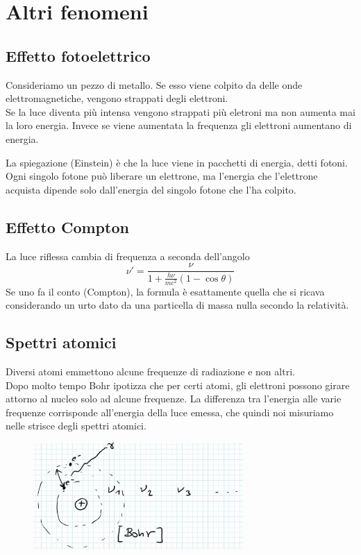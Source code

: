 \section{Altri fenomeni}
\subsection{Effetto fotoelettrico}
Consideriamo un pezzo di metallo. Se esso viene colpito da delle onde elettromagnetiche, vengono strappati degli elettroni.\\
Se la luce diventa pi\`u intensa vengono strappati pi\`u eletroni ma non aumenta mai la loro energia. Invece se viene aumentata la frequenza gli elettroni aumentano di energia.\bigskip

\noindent
La spiegazione (Einstein) \`e che la luce viene in pacchetti di energia, detti fotoni. Ogni singolo fotone pu\`o liberare un elettrone, ma l'energia che l'elettrone acquista dipende solo dall'energia del singolo fotone che l'ha colpito.

\subsection{Effetto Compton}
La luce riflessa cambia di frequenza a seconda dell'angolo
\[\nu'=\frac{\nu}{1+\frac{h\nu}{mc^2}(1-\cos\theta)}\]
Se uno fa il conto (Compton), la formula \`e esattamente quella che si ricava considerando un urto dato da una particella di massa nulla secondo la relativit\`a.

\subsection{Spettri atomici}
Diversi atomi emmettono alcune frequenze di radiazione e non altri.\\
Dopo molto tempo Bohr ipotizza che per certi atomi, gli elettroni possono girare attorno al nucleo solo ad alcune frequenze. La differenza tra l'energia alle varie frequenze corrisponde all'energia della luce emessa, che quindi noi misuriamo nelle strisce degli spettri atomici.

\begin{figure}[!htb]
    \centering
    \includegraphics[width=8cm]{images/diverse_frequenze.png}
\end{figure}
